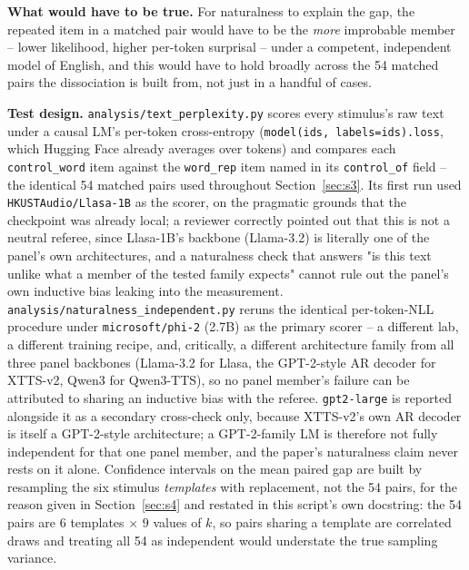 \documentclass[11pt]{article}
\begin{document}
\textbf{What would have to be true.} For naturalness to explain the gap, the
repeated item in a matched pair would have to be the \emph{more} improbable
member -- lower likelihood, higher per-token surprisal -- under a competent,
independent model of English, and this would have to hold broadly across the
54 matched pairs the dissociation is built from, not just in a handful of
cases.

\textbf{Test design.} \texttt{analysis/text\_perplexity.py} scores every
stimulus's raw text under a causal LM's per-token cross-entropy
(\texttt{model(ids, labels=ids).loss}, which Hugging Face already averages
over tokens) and compares each \texttt{control\_word} item against the
\texttt{word\_rep} item named in its \texttt{control\_of} field -- the
identical 54 matched pairs used throughout Section~\ref{sec:s3}. Its first
run used \texttt{HKUSTAudio/Llasa-1B} as the scorer, on the pragmatic grounds
that the checkpoint was already local; a reviewer correctly pointed out that
this is not a neutral referee, since Llasa-1B's backbone (Llama-3.2) is
literally one of the panel's own architectures, and a naturalness check that
answers "is this text unlike what a member of the tested family expects"
cannot rule out the panel's own inductive bias leaking into the measurement.
\texttt{analysis/naturalness\_independent.py} reruns the identical
per-token-NLL procedure under \texttt{microsoft/phi-2} (2.7B) as the primary
scorer -- a different lab, a different training recipe, and, critically, a
different architecture family from all three panel backbones (Llama-3.2 for
Llasa, the GPT-2-style AR decoder for XTTS-v2, Qwen3 for Qwen3-TTS), so no
panel member's failure can be attributed to sharing an inductive bias with the
referee. \texttt{gpt2-large} is reported alongside it as a secondary
cross-check only, because XTTS-v2's own AR decoder is itself a GPT-2-style
architecture; a GPT-2-family LM is therefore not fully independent for that
one panel member, and the paper's naturalness claim never rests on it alone.
Confidence intervals on the mean paired gap are built by resampling the six
stimulus \emph{templates} with replacement, not the 54 pairs, for the reason
given in Section~\ref{sec:s4} and restated in this script's own docstring:
the 54 pairs are $6$ templates $\times$ $9$ values of $k$, so pairs sharing a
template are correlated draws and treating all 54 as independent would
understate the true sampling variance.
\end{document}

